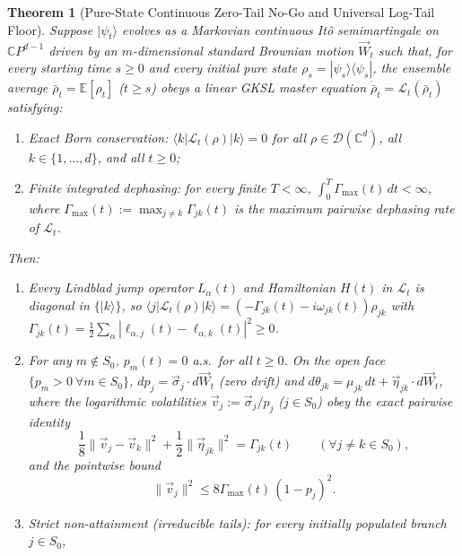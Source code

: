 \documentclass[aps,pra,10pt,twocolumn,superscriptaddress,amsmath,amssymb,floatfix]{revtex4-2}
\newtheorem{theorem}{Theorem}
\newcommand{\E}{\mathbb{E}}
\newcommand{\ket}[1]{|#1\rangle}
\newcommand{\bra}[1]{\langle #1|}
\newcommand{\ketbra}[2]{|#1\rangle\langle #2|}
\begin{document}
\begin{theorem}[Pure-State Continuous Zero-Tail No-Go and Universal Log-Tail Floor]
\label{thm:nogo}
Suppose $\ket{\psi_t}$ evolves as a Markovian continuous It\^o semimartingale on $\mathbb{C}P^{d-1}$ driven by an $m$-dimensional standard Brownian motion $\vec{W}_t$ such that, for every starting time $s \ge 0$ and every initial pure state $\rho_s = \ketbra{\psi_s}{\psi_s}$, the ensemble average $\bar{\rho}_t = \E[\rho_t]$ ($t \ge s$) obeys a linear GKSL master equation $\dot{\bar{\rho}}_t = \mathcal{L}_t(\bar{\rho}_t)$ satisfying:
\begin{enumerate}
\item[(i)] \emph{Exact Born conservation:} $\bra{k}\mathcal{L}_t(\rho)\ket{k} = 0$ for all $\rho \in \mathcal{D}(\mathbb{C}^d)$, all $k \in \{1,\dots,d\}$, and all $t \ge 0$;
\item[(ii)] \emph{Finite integrated dephasing:} for every finite $T < \infty$, $\int_0^T \Gamma_{\max}(t)\,dt < \infty$, where $\Gamma_{\max}(t) := \max_{j \ne k}\Gamma_{jk}(t)$ is the maximum pairwise dephasing rate of $\mathcal{L}_t$.
\end{enumerate}
Then:
\begin{enumerate}
\item[(a)] Every Lindblad jump operator $L_\alpha(t)$ and Hamiltonian $H(t)$ in $\mathcal{L}_t$ is diagonal in $\{\ket{k}\}$, so $\bra{j}\mathcal{L}_t(\rho)\ket{k} = (-\Gamma_{jk}(t) - i\omega_{jk}(t))\rho_{jk}$ with $\Gamma_{jk}(t) = \frac{1}{2}\sum_\alpha |\ell_{\alpha,j}(t)-\ell_{\alpha,k}(t)|^2 \ge 0$.
\item[(b)] For any $m \notin S_0$, $p_m(t) = 0$ a.s.\ for all $t \ge 0$. On the open face $\{p_m > 0\ \forall m \in S_0\}$, $dp_j = \vec{\sigma}_j \cdot d\vec{W}_t$ (zero drift) and $d\theta_{jk} = \mu_{jk}\,dt + \vec{\eta}_{jk}\cdot d\vec{W}_t$, where the logarithmic volatilities $\vec{v}_j := \vec{\sigma}_j / p_j$ ($j \in S_0$) obey the exact pairwise identity
\begin{equation}
\label{eq:pairwise}
\frac{1}{8}\|\vec{v}_j - \vec{v}_k\|^2 + \frac{1}{2}\|\vec{\eta}_{jk}\|^2 = \Gamma_{jk}(t) \qquad (\forall j \ne k \in S_0),
\end{equation}
and the pointwise bound
\begin{equation}
\label{eq:vbound}
\|\vec{v}_j\|^2 \le 8\Gamma_{\max}(t)\,(1 - p_j)^2.
\end{equation}
\item[(c)] \emph{Strict non-attainment (irreducible tails):} for every initially populated branch $j \in S_0$,

\end{enumerate}
\end{theorem}
\end{document}
